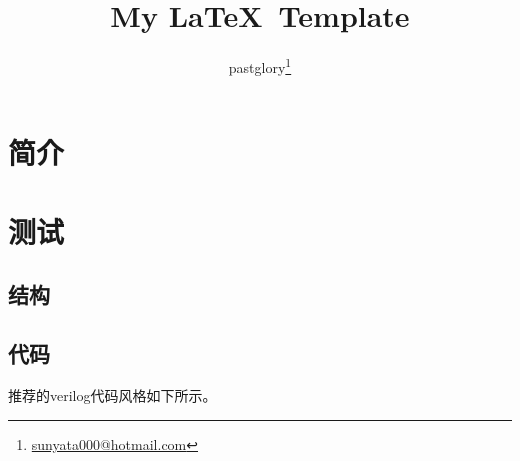\documentclass[zh, a4paper, 12pt]{pgreport}
\title {My \LaTeX\ Template}
\author{pastglory\thanks{\href{mailto:sunyata000@hotmail.com}{sunyata000@hotmail.com}}}
\date{}
\begin{document}
\maketitle
\tableofcontents
\begin{abstract}

\end{abstract}

\section{简介}


\section{测试}

\subsection{结构}


\subsection{代码}
推荐的verilog代码风格如下所示。



\end{document}

